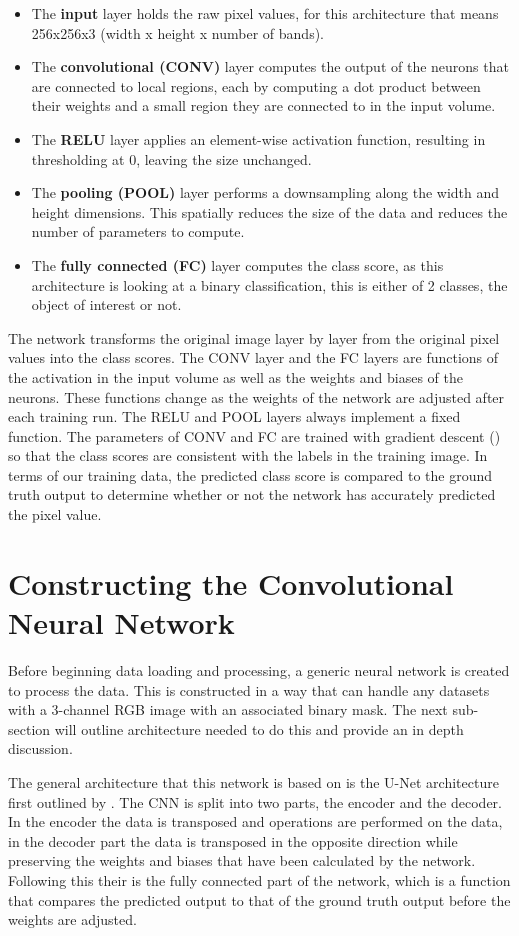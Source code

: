 \begin{itemize}
    
    \item The \textbf{input} layer holds the raw pixel values, for this architecture that means 256x256x3 (width x height x number of bands).
    \item The \textbf{convolutional (CONV)} layer computes the output of the neurons that are connected to local regions, each by computing a dot product between their weights and a small region they are connected to in the input volume.
    \item The \textbf{RELU} layer applies an element-wise activation function, resulting in thresholding at 0, leaving the size unchanged.
    \item The \textbf{pooling (POOL)} layer performs a downsampling along the width and height dimensions. This spatially reduces the size of the data and reduces the number of parameters to compute.
    \item The \textbf{fully connected (FC)} layer computes the class score, as this architecture is looking at a binary classification, this is either of 2 classes, the object of interest or not. 
\end{itemize}
\par
The network transforms the original image layer by layer from the original pixel values into the class scores. The CONV layer and the FC layers are functions of the activation in the input volume as well as the weights and biases of the neurons. These functions change as the weights of the network are adjusted after each training run. The RELU and POOL layers always implement a fixed function. The parameters of CONV and FC are trained with gradient descent (\cite{Bottou98,Sutskever13}) so that the class scores are consistent with the labels in the training image. In terms of our training data, the predicted class score is compared to the ground truth output to determine whether or not the network has accurately predicted the pixel value.
\par

\section{Constructing the Convolutional Neural Network}
Before beginning data loading and processing, a generic neural network is created to process the data. This is constructed in a way that can handle any datasets with a 3-channel RGB image with an associated binary mask. The next sub-section will outline architecture needed to do this and provide an in depth discussion. 
\par
The general architecture that this network is based on is the U-Net architecture first outlined by \citet{ronneberger15}. The CNN is split into two parts, the encoder and the decoder. In the encoder the data is transposed and operations are performed on the data, in the decoder part the data is transposed in the opposite direction while preserving the weights and biases that have been calculated by the network. Following this their is the fully connected part of the network, which is a function that compares the predicted output to that of the ground truth output before the weights are adjusted.


